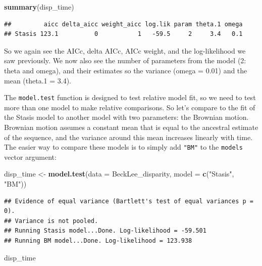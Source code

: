 \documentclass[]{book}
\newenvironment{Shaded}{\begin{snugshade}}{\end{snugshade}}
\newcommand{\KeywordTok}[1]{\textcolor[rgb]{0.13,0.29,0.53}{\textbf{#1}}}
\newcommand{\DataTypeTok}[1]{\textcolor[rgb]{0.13,0.29,0.53}{#1}}
\newcommand{\StringTok}[1]{\textcolor[rgb]{0.31,0.60,0.02}{#1}}
\newcommand{\NormalTok}[1]{#1}
\theoremstyle{definition}
\theoremstyle{definition}
\theoremstyle{definition}
\theoremstyle{remark}
\begin{document}
\begin{Shaded}
\begin{Highlighting}[]
\KeywordTok{summary}\NormalTok{(disp_time)}
\end{Highlighting}
\end{Shaded}

\begin{verbatim}
##         aicc delta_aicc weight_aicc log.lik param theta.1 omega
## Stasis 123.1          0           1   -59.5     2     3.4   0.1
\end{verbatim}

So we again see the AICc, delta AICc, AICc weight, and the
log-likelihood we saw previously. We now also see the number of
parameters from the model (2: theta and omega), and their estimates so
the variance (omega = 0.01) and the mean (theta.1 = 3.4).

The \texttt{model.test} function is designed to test relative model fit,
so we need to test more than one model to make relative comparisons. So
let's compare to the fit of the Stasis model to another model with two
parameters: the Brownian motion. Brownian motion assumes a constant mean
that is equal to the ancestral estimate of the sequence, and the
variance around this mean increases linearly with time. The easier way
to compare these models is to simply add \texttt{"BM"} to the
\texttt{models} vector argument:

\begin{Shaded}
\begin{Highlighting}[]
\NormalTok{disp_time <-}\StringTok{ }\KeywordTok{model.test}\NormalTok{(}\DataTypeTok{data =}\NormalTok{ BeckLee_disparity, }\DataTypeTok{model =} \KeywordTok{c}\NormalTok{(}\StringTok{"Stasis"}\NormalTok{, }\StringTok{"BM"}\NormalTok{))}
\end{Highlighting}
\end{Shaded}

\begin{verbatim}
## Evidence of equal variance (Bartlett's test of equal variances p = 0).
## Variance is not pooled.
## Running Stasis model...Done. Log-likelihood = -59.501
## Running BM model...Done. Log-likelihood = 123.938
\end{verbatim}

\begin{Shaded}
\begin{Highlighting}[]
\NormalTok{disp_time}
\end{Highlighting}
\end{Shaded}
\end{document}
